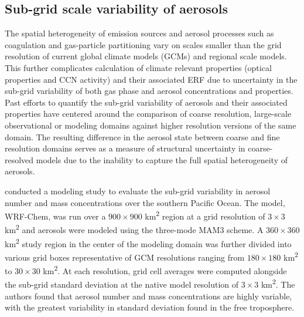 \subsection{Sub-grid scale variability of aerosols}

The spatial heterogeneity of emission sources and aerosol processes such as coagulation and gas-particle partitioning vary on scales smaller than the grid resolution of current global climate models (GCMs) and regional scale models. This further complicates calculation of climate relevant properties  (optical properties and CCN activity) and their associated ERF due to uncertainty in the sub-grid variability of both gas phase and aerosol concentrations and properties. Past efforts to quantify the sub-grid variability of aerosols and their associated properties have centered around the comparison of coarse resolution, large-scale observational or modeling domains against higher resolution versions of the same domain. The resulting difference in the aerosol state between coarse and fine resolution domains serves as a measure of structural uncertainty in coarse-resolved models due to the inability to capture the full spatial heterogeneity of aerosols. 

\textcite{lin_quantification_2017} conducted a modeling study to evaluate the sub-grid variability in aerosol number and mass concentrations over the southern Pacific Ocean. The model, WRF-Chem, was run over a $900\times900$ \si{km^2} region at a grid resolution of $3\times3$ \si{km^2} and aerosols were modeled using the three-mode MAM3 scheme. A $360\times360$ \si{km^2} study region in the center of the modeling domain was further divided into various grid boxes representative of GCM resolutions ranging from $180\times180$ \si{km^2} to $30\times30$ \si{km^2}. At each resolution, grid cell averages were computed alongside the sub-grid standard deviation at the native model resolution of $3\times3$ \si{km^2}. The authors found that aerosol number and mass concentrations are highly variable, with the greatest variability in standard deviation found in the free troposphere. 

